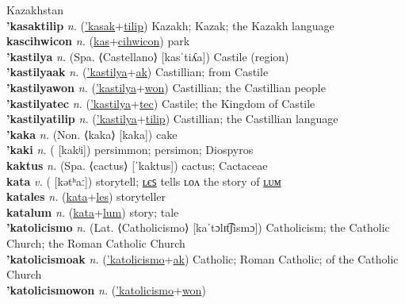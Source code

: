 Kazakhstan \label{'kasaktec} \\
\textbf{'kasaktilip} \textit{n.} (\hyperref['kasak]{'kasak}+\hyperref[tilip]{tilip})
Kazakh; Kazak; the Kazakh language \label{'kasaktilip} \\
\textbf{kascihwicon} \textit{n.} (\hyperref[kas]{kas}+\hyperref[cihwicon]{cihwicon})
park \label{kascihwicon} \\
\textbf{'kastilya} \textit{n.} (Spa. ⟨Castellano⟩ [kasˈtiʎa])
Castile (region) \label{'kastilya} \\
\textbf{'kastilyaak} \textit{n.} (\hyperref['kastilya]{'kastilya}+\hyperref[ak]{ak})
Castillian; from Castile \label{'kastilyaak} \\
\textbf{'kastilyawon} \textit{n.} (\hyperref['kastilya]{'kastilya}+\hyperref[won]{won})
Castillian; the Castillian people \label{'kastilyawon} \\
\textbf{'kastilyatec} \textit{n.} (\hyperref['kastilya]{'kastilya}+\hyperref[tec]{tec})
Castile; the Kingdom of Castile \label{'kastilyatec} \\
\textbf{'kastilyatilip} \textit{n.} (\hyperref['kastilya]{'kastilya}+\hyperref[tilip]{tilip})
Castillian; the Castillian language \label{'kastilyatilip} \\
\textbf{'kaka} \textit{n.} (Non. ⟨kaka⟩ [kaka])
cake \label{'kaka} \\
\textbf{'kaki} \textit{n.} ( [kakʲi])
persimmon; persimon; Diospyros \label{'kaki} \\
\textbf{kaktus} \textit{n.} (Spa. ⟨cactus⟩ [ˈkaktus])
cactus; Cactaceae \label{kaktus} \\
\textbf{kata} \textit{v.} ( [kətʰaː])
storytell; \hyperref[katales]{ʟєꜱ} tells ʟᴏᴧ the story of \hyperref[katalum]{ʟᴜᴍ} \label{kata} \\
\textbf{katales} \textit{n.} (\hyperref[kata]{kata}+\hyperref[les]{les})
storyteller \label{katales} \\
\textbf{katalum} \textit{n.} (\hyperref[kata]{kata}+\hyperref[lum]{lum})
story; tale \label{katalum} \\
\textbf{'katolicismo} \textit{n.} (Lat. ⟨Catholicismo⟩ [kaˈtɔlɪt͡ʃismɔ])
Catholicism; the Catholic Church; the Roman Catholic Church \label{'katolicismo} \\
\textbf{'katolicismoak} \textit{n.} (\hyperref['katolicismo]{'katolicismo}+\hyperref[ak]{ak})
Catholic; Roman Catholic; of the Catholic Church \label{'katolicismoak} \\
\textbf{'katolicismowon} \textit{n.} (\hyperref['katolicismo]{'katolicismo}+\hyperref[won]{won})
